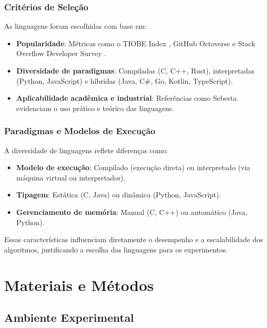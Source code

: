 \documentclass[12pt, a4paper]{article}
\begin{document}
\subsubsection{Critérios de Seleção}

As linguagens foram escolhidas com base em:

\begin{itemize}
    \item \textbf{Popularidade}: Métricas como o TIOBE Index , GitHub Octoverse  e Stack Overflow Developer Survey .
    \item \textbf{Diversidade de paradigmas}: Compiladas (C, C++, Rust), interpretadas (Python, JavaScript) e híbridas (Java, C\#, Go, Kotlin, TypeScript).
    \item \textbf{Aplicabilidade acadêmica e industrial}: Referências como Sebesta  evidenciam o uso prático e teórico das linguagens.
\end{itemize}

\subsubsection{Paradigmas e Modelos de Execução}

A diversidade de linguagens reflete diferenças como:

\begin{itemize}
    \item \textbf{Modelo de execução}: Compilado (execução direta) ou interpretado (via máquina virtual ou interpretador).
    \item \textbf{Tipagem}: Estática (C, Java) ou dinâmica (Python, JavaScript).
    \item \textbf{Gerenciamento de memória}: Manual (C, C++) ou automático (Java, Python).
\end{itemize}

Essas características influenciam diretamente o desempenho e a escalabilidade dos algoritmos, justificando a escolha das linguagens para os experimentos.


\section{Materiais e Métodos}

\subsection{Ambiente Experimental}
\end{document}
